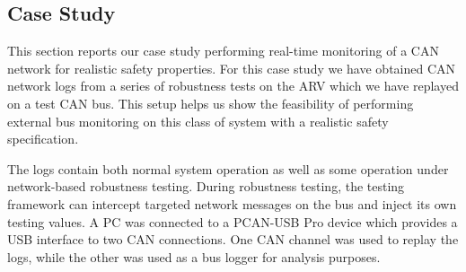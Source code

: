 %

\subsection{Case Study}
\label{sec:case_study}
This section reports our case study performing real-time monitoring of a CAN network for realistic safety properties.
For this case study we have obtained CAN network logs from a series of robustness tests on the ARV which we have replayed on a test CAN bus.
This setup %
helps us show the feasibility of performing external bus monitoring on this class of system with a realistic safety specification.


The logs contain both normal system operation as well as some operation under network-based robustness testing. During robustness testing, the testing framework can intercept targeted network messages on the bus and inject its own testing values. %
A PC was connected to a PCAN-USB Pro \cite{PCAN-USBPro} device which provides a USB interface to two CAN connections. One CAN channel was used to replay the logs, while the other was used as a bus logger for analysis purposes.

